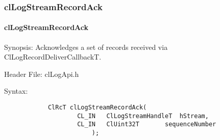 \begin{flushleft}
\subsubsection{clLogStreamRecordAck}
\hypertarget{pagelog114}{}\paragraph{cl\-Log\-Stream\-Record\-Ack}\label{pagelog114}
\begin{Desc}
\item[Synopsis:] Acknowledges a set of records received via ClLogRecordDeliverCallbackT. \end{Desc}
\begin{Desc}
\item[Header File:] clLogApi.h \end{Desc}
\begin{Desc}
\item[Syntax:]
\footnotesize\begin{verbatim}        	
			ClRcT clLogStreamRecordAck(
					CL_IN	ClLogStreamHandleT	hStream,
					CL_IN	ClUint32T		sequenceNumber
						);



\end{verbatim}
\end{Desc}
\end{flushleft}
